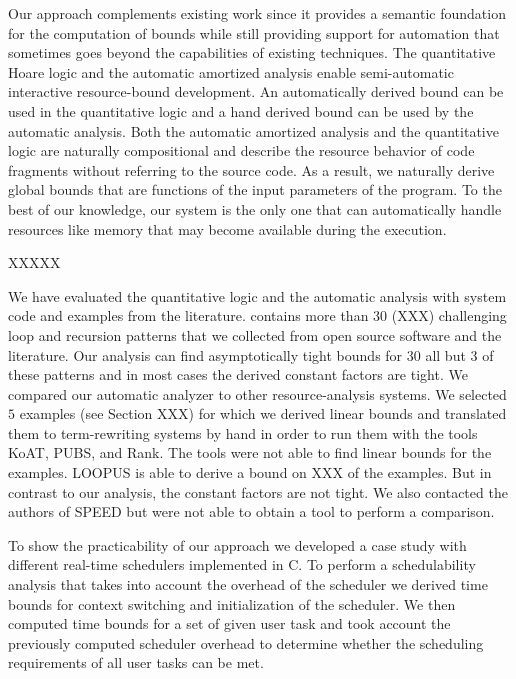 \documentclass[nocopyrightspace,preprint]{sigplanconf}
\newcommand{\pref}[1]{\prettyref{#1}}
\begin{document}
Our approach complements existing work since it provides a semantic
foundation for the computation of bounds while still providing support
for automation that sometimes goes beyond the capabilities of existing
techniques.  The quantitative Hoare logic and the automatic amortized
analysis enable semi-automatic interactive resource-bound development.
An automatically derived bound can be used in the quantitative logic
and a hand derived bound can be used by the automatic analysis.  Both
the automatic amortized analysis and the quantitative logic are
naturally compositional and describe the resource behavior of code
fragments without referring to the source code.  As a result, we
naturally derive global bounds that are functions of the input
parameters of the program.  To the best of our knowledge, our system
is the only one that can automatically handle resources like memory
that may become available during the execution.

XXXXX

We have evaluated the quantitative logic and the automatic analysis
with system code and examples from the literature. \pref{app:cat}
contains more than $30$ (XXX) challenging loop and recursion patterns
that we collected from open source software and the literature.  Our
analysis can find asymptotically tight bounds for $30$ all but 3 of
these patterns and in most cases the derived constant factors are
tight.  We compared our automatic analyzer to other resource-analysis
systems.  We selected $5$ examples (see Section XXX) for which we
derived linear bounds and translated them to term-rewriting systems by
hand in order to run them with the tools KoAT, PUBS, and Rank.  The
tools were not able to find linear bounds for the examples.  LOOPUS is
able to derive a bound on XXX of the examples.  But in contrast to our
analysis, the constant factors are not tight.  We also contacted the
authors of SPEED but were not able to obtain a tool to perform a
comparison.

To show the practicability of our approach we developed a case study
with different real-time schedulers implemented in C.  To perform a
schedulability analysis that takes into account the overhead of the
scheduler we derived time bounds for context switching and
initialization of the scheduler.  We then computed time bounds for a
set of given user task and took account the previously computed
scheduler overhead to determine whether the scheduling requirements of
all user tasks can be met.
\end{document}
